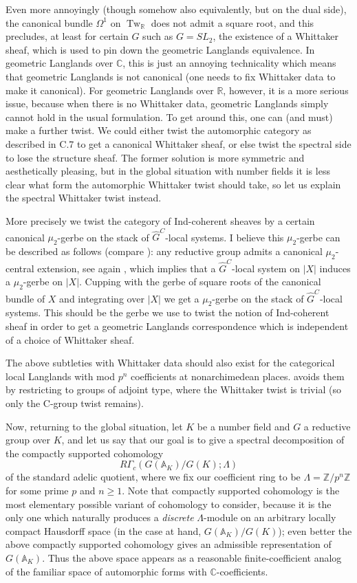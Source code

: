 \documentclass[12pt]{article}
\theoremstyle{definition}
\newcommand{\on}{\operatorname}
\newcommand{\mbb}{\mathbb}
\newcommand{\wh}{\widehat}
\begin{document}
\begin{enumerate}
Even more annoyingly (though somehow also equivalently, but on the dual side), the canonical bundle $\Omega^1$ on $\on{Tw}_{\mbb{R}}$ does not admit a square root, and this precludes, at least for certain $G$ such as $G=SL_2$, the existence of a Whittaker sheaf, which is used to pin down the geometric Langlands equivalence.  In geometric Langlands over $\mbb{C}$, this is just an annoying technicality which means that geometric Langlands is not canonical (one needs to fix Whittaker data to make it canonical).  For geometric Langlands over $\mbb{R}$, however, it is a more serious issue, because when there is no Whittaker data, geometric Langlands simply cannot hold in the usual formulation.  To get around this, one can (and must) make a further twist.  We could either twist the automorphic category as described in \cite{bzsv} C.7  to get a canonical Whittaker sheaf, or else twist the spectral side to lose the structure sheaf.  The former solution is more symmetric and aesthetically pleasing, but in the global situation with number fields it is less clear what form the automorphic Whittaker twist should take, so let us explain the spectral Whittaker twist instead.

More precisely we twist the category of Ind-coherent sheaves by a certain canonical $\mu_2$-gerbe on the stack of $\wh{G}^C$-local systems.  I believe this $\mu_2$-gerbe can be described as follows (compare \cite{gaitsgoryraskin}): any reductive group admits a canonical $\mu_2$-central extension, see again \cite{bernsteinsign}, which implies that a $\wh{G}^C$-local system on $|X|$ induces a $\mu_2$-gerbe on $|X|$.  Cupping with the gerbe of square roots of the canonical bundle of $X$ and integrating over $|X|$ we get a $\mu_2$-gerbe on the stack of $\wh{G}^C$-local systems. This should be the gerbe we use to twist the notion of Ind-coherent sheaf in order to get a geometric Langlands correspondence which is independent of a choice of Whittaker sheaf.

The above subtleties with Whittaker data should also exist for the categorical local Langlands with mod $p^n$ coefficients at nonarchimedean places.  \cite{egh} avoids them by restricting to groups of adjoint type, where the Whittaker twist is trivial (so only the C-group twist remains).

Now, returning to the global situation, let $K$ be a number field and $G$ a reductive group over $K$, and let us say that our goal is to give a spectral decomposition of the compactly supported cohomology
$$R\Gamma_c(G(\mbb{A}_K)/G(K);\Lambda)$$
 of the standard adelic quotient, where we fix our coefficient ring to be $\Lambda=\mbb{Z}/p^n\mbb{Z}$ for some prime $p$ and $n\geq 1$.  Note that compactly supported cohomology is the most elementary possible variant of cohomology to consider, because it is the only one which naturally produces a \emph{discrete} $\Lambda$-module on an arbitrary locally compact Hausdorff space (in the case at hand, $G(\mbb{A}_K)/G(K)$); even better the above compactly supported cohomology gives an admissible representation of $G(\mbb{A}_K)$.  Thus the above space appears as a reasonable finite-coefficient analog of the familiar space of automorphic forms with $\mbb{C}$-coefficients.


\end{enumerate}
\end{document}
